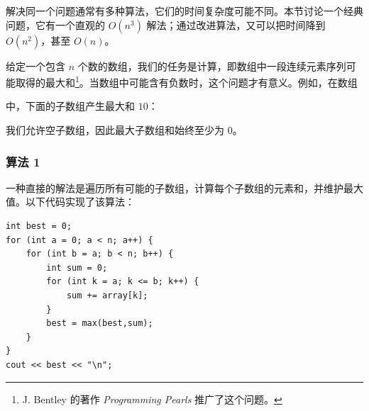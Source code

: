 
解决同一个问题通常有多种算法，它们的时间复杂度可能不同。本节讨论一个经典问题，它有一个直观的 $O(n^3)$ 解法；通过改进算法，又可以把时间降到 $O(n^2)$，甚至 $O(n)$。

给定一个包含 $n$ 个数的数组，我们的任务是计算，即数组中一段连续元素序列可能取得的最大和\footnote{J. Bentley 的著作 \emph{Programming Pearls} \cite{ben86} 推广了这个问题。}。当数组中可能含有负数时，这个问题才有意义。例如，在数组
\begin{center}
\end{center}
\begin{samepage}
中，下面的子数组产生最大和 $10$：
\begin{center}
\end{center}
\end{samepage}

我们允许空子数组，因此最大子数组和始终至少为 $0$。

\subsubsection{算法 1}

一种直接的解法是遍历所有可能的子数组，计算每个子数组的元素和，并维护最大值。以下代码实现了该算法：

\begin{lstlisting}
int best = 0;
for (int a = 0; a < n; a++) {
    for (int b = a; b < n; b++) {
        int sum = 0;
        for (int k = a; k <= b; k++) {
            sum += array[k];
        }
        best = max(best,sum);
    }
}
cout << best << "\n";
\end{lstlisting}

